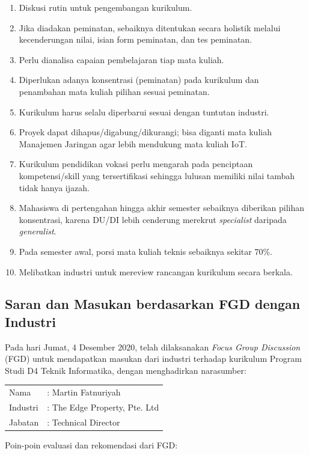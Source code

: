 \begin{enumerate}
\item Diskusi rutin untuk pengembangan kurikulum.
\item Jika diadakan peminatan, sebaiknya ditentukan secara holistik melalui kecenderungan nilai, isian form peminatan, dan tes peminatan.
\item Perlu dianalisa capaian pembelajaran tiap mata kuliah.
\item Diperlukan adanya konsentrasi (peminatan) pada kurikulum dan penambahan mata kuliah pilihan sesuai peminatan.
\item Kurikulum harus selalu diperbarui sesuai dengan tuntutan industri.
\item Proyek dapat dihapus/digabung/dikurangi; bisa diganti mata kuliah Manajemen Jaringan agar lebih mendukung mata kuliah IoT.
\item Kurikulum pendidikan vokasi perlu mengarah pada penciptaan kompetensi/skill yang tersertifikasi sehingga lulusan memiliki nilai tambah tidak hanya ijazah.
\item Mahasiswa di pertengahan hingga akhir semester sebaiknya diberikan pilihan konsentrasi, karena DU/DI lebih cenderung merekrut \textit{specialist} daripada \textit{generalist}.
\item Pada semester awal, porsi mata kuliah teknis sebaiknya sekitar 70\%.
\item Melibatkan industri untuk mereview rancangan kurikulum secara berkala.
\end{enumerate}

\subsection{Saran dan Masukan berdasarkan FGD dengan Industri}

Pada hari Jumat, 4 Desember 2020, telah dilaksanakan \textit{Focus Group Discussion} (FGD) untuk mendapatkan masukan dari industri terhadap kurikulum Program Studi D4 Teknik Informatika, dengan menghadirkan narasumber:

\begin{tabular}{L{3cm}L{9.5cm}}
Nama & : Martin Fatnuriyah \\
Industri & : The Edge Property, Pte. Ltd \\
Jabatan & : Technical Director \\
\end{tabular}

Poin-poin evaluasi dan rekomendasi dari FGD:

